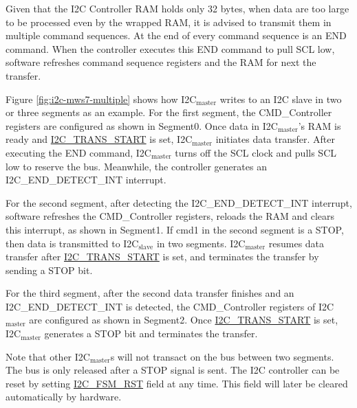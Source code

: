 \documentclass[main\_\_EN.tex]{subfiles}
\begin{document}
Given that the I2C Controller RAM holds only 32 bytes, when data are too large to be processed even by the wrapped RAM, it is advised to transmit them in multiple command sequences. At the end of every command sequence is an END command. When the controller executes this END command to pull SCL low, software refreshes command sequence registers and the RAM for next the transfer.

Figure \ref{fig:i2c-mws7-multiple} shows how I2C$_\text{master}$ writes to an I2C slave in two or three segments as an example. For the first segment, the CMD\_Controller registers are configured as shown in Segment0. Once data in I2C$_\text{master}$'s RAM is ready and \hyperref[fielddesc:I2CTRANSSTART]{I2C\_TRANS\_START} is set, I2C$_\text{master}$ initiates data transfer. After executing the END command, I2C$_\text{master}$ turns off the SCL clock and pulls SCL low to reserve the bus. Meanwhile, the controller generates an I2C\_END\_DETECT\_INT interrupt.

For the second segment, after detecting the I2C\_END\_DETECT\_INT interrupt, software refreshes the CMD\_Controller registers, reloads the RAM and clears this interrupt, as shown in Segment1. If cmd1 in the second segment is a STOP, then data is transmitted to I2C$_\text{slave}$ in two segments. I2C$_\text{master}$ resumes data transfer after \hyperref[fielddesc:I2CTRANSSTART]{I2C\_TRANS\_START} is set, and terminates the transfer by sending a STOP bit.

For the third segment, after the second data transfer finishes and an I2C\_END\_DETECT\_INT is detected, the CMD\_Controller registers of I2C$_\text{master}$ are configured as shown in Segment2. Once \hyperref[fielddesc:I2CTRANSSTART]{I2C\_TRANS\_START} is set, I2C$_\text{master}$ generates a STOP bit and terminates the transfer. 

Note that other I2C$_\text{master}$s will not transact on the bus between two segments. The bus is only released after a STOP signal is sent. The I2C controller can be reset by setting \hyperref[fielddesc:I2CFSMRST]{I2C\_FSM\_RST} field at any time. This field will later be cleared automatically by hardware.
\end{document}
